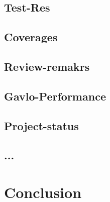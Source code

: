 \documentclass[master,english,smartquotes,apa]{hgbthesis}
\begin{document}
		\section{Test-Res}
		\section{Coverages}
		\section{Review-remakrs}
		\section{Gavlo-Performance}
		\section{Project-status}
		\section{ ... }
	\chapter{Conclusion}
	\label{cha:Conclusion}


% 
% 
% 
% 
% 

\appendix                                                             %


\backmatter                           %



\MakeBibliography %


% 

\end{document}
